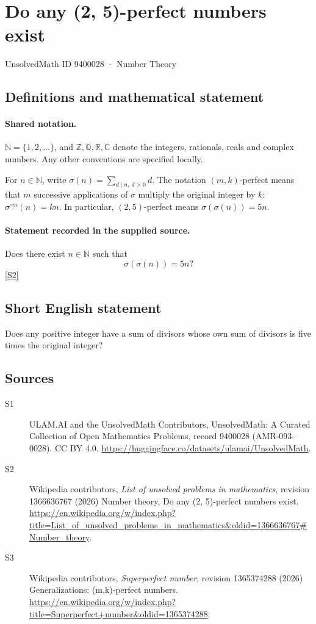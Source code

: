 \documentclass[11pt]{article}
\newcommand{\sref}[2]{\hyperlink{source:#1:#2}{[S#2]}}
\begin{document}
\setcounter{section}{9400027}
\section{Do any (2, 5)-perfect numbers exist}\label{9400028}
{\small\sffamily UnsolvedMath ID 9400028 · Number Theory}
\subsection{Definitions and mathematical statement}

\paragraph{Shared notation.}$\mathbb N=\{1,2,\ldots\}$, and $\mathbb Z,\mathbb Q,\mathbb R,\mathbb C$ denote the integers, rationals, reals and complex numbers. Any other conventions are specified locally.


For $n\in\mathbb N$, write $\sigma(n)=\sum_{d\mid n,\ d>0}d$. The notation $(m,k)$-perfect means that $m$ successive applications of $\sigma$ multiply the original integer by $k$: $\sigma^{\circ m}(n)=kn$. In particular, $(2,5)$-perfect means $\sigma(\sigma(n))=5n$.
\paragraph{Statement recorded in the supplied source.}
Does there exist $n\in\mathbb N$ such that
\[\sigma(\sigma(n))=5n?\] \sref{9400028}{2}
\subsection{Short English statement}
Does any positive integer have a sum of divisors whose own sum of divisors is five times the original integer?
\subsection{Sources}
\begin{description}
\item[\hypertarget{source:9400028:1}{S1}] ULAM.AI and the UnsolvedMath Contributors, UnsolvedMath: A Curated Collection of Open Mathematics Problems, record 9400028 (AMR-093-0028). CC BY 4.0. \url{https://huggingface.co/datasets/ulamai/UnsolvedMath}.
\item[\hypertarget{source:9400028:2}{S2}] Wikipedia contributors, \emph{List of unsolved problems in mathematics}, revision 1366636767 (2026) Number theory, Do any (2, 5)-perfect numbers exist. \url{https://en.wikipedia.org/w/index.php?title=List_of_unsolved_problems_in_mathematics&oldid=1366636767#Number_theory}.
\item[\hypertarget{source:9400028:3}{S3}] Wikipedia contributors, \emph{Superperfect number}, revision 1365374288 (2026) Generalizations: (m,k)-perfect numbers. \url{https://en.wikipedia.org/w/index.php?title=Superperfect+number&oldid=1365374288}.
\end{description}
\label{end:9400028}
\end{document}
